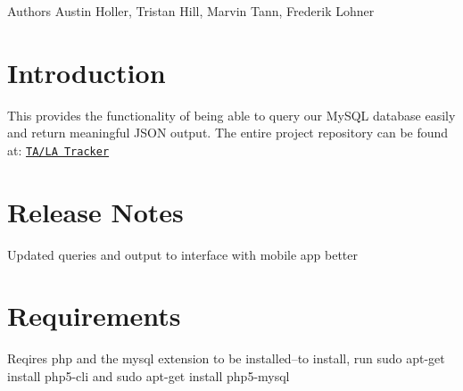 \begin{DoxyAuthor}{Authors}
Austin Holler, Tristan Hill, Marvin Tann, Frederik Lohner
\end{DoxyAuthor}
\hypertarget{index_intro}{}\section{Introduction}\label{index_intro}
This provides the functionality of being able to query our My\-S\-Q\-L database easily and return meaningful J\-S\-O\-N output. The entire project repository can be found at\-: \href{https://github.com/FredLoh/TA-LA-Schedule-Tracker}{\tt T\-A/\-L\-A Tracker}



 \hypertarget{index_notes}{}\section{Release Notes}\label{index_notes}

\begin{DoxyItemize}
\item Updated queries and output to interface with mobile app better 

 
\end{DoxyItemize}\hypertarget{index_requirements}{}\section{Requirements}\label{index_requirements}
Reqires php and the mysql extension to be installed--to install, run sudo apt-\/get install php5-\/cli and sudo apt-\/get install php5-\/mysql 